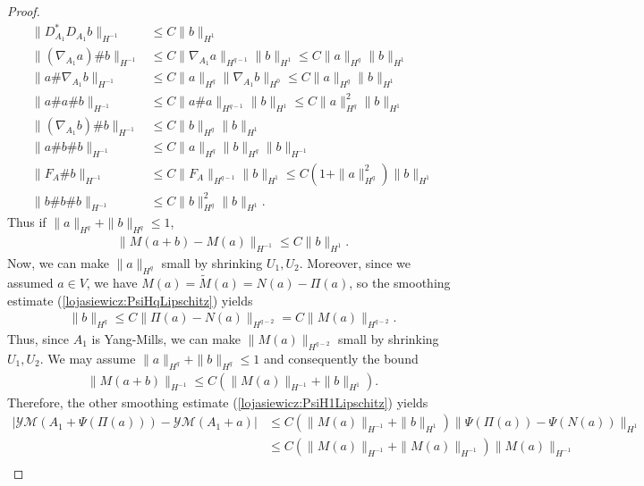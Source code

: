 \documentclass[12pt]{amsart}
\renewcommand{\1}{{\mathbf 1}}
\theoremstyle{others}
\numberwithin{equation}{section}
\begin{document}
\begin{proof}
    \begin{align*}
        \|D_{A_1}^\ast D_{A_1} b\|_{H^{-1}} &\leq C\|b\|_{H^1} \\
        \|(\nabla_{A_1} a) \# b \|_{H^{-1}} &\leq C\|\nabla_{A_1} a\|_{H^{q-1}}\|b\|_{H^1} \leq C\|a\|_{H^q}\|b\|_{H^1} \\
        \|a \# \nabla_{A_1} b\|_{H^{-1}} &\leq C\|a\|_{H^q} \|\nabla_{A_1} b\|_{H^0} \leq C\|a\|_{H^q}\|b\|_{H^1} \\
        \|a \# a \# b\|_{H^{-1}} &\leq C\|a \# a\|_{H^{q-1}} \|b\|_{H^1} \leq C\|a\|_{H^q}^2\|b\|_{H^1} \\
        \|(\nabla_{A_1} b) \# b\|_{H^{-1}} &\leq C\|b\|_{H^q} \|b\|_{H^1} \\
        \|a \# b \# b\|_{H^{-1}} &\leq C\|a\|_{H^q}\|b\|_{H^q}\|b\|_{H^{-1}} \\
        \|F_A \# b\|_{H^{-1}} &\leq C\|F_A\|_{H^{q-1}} \|b\|_{H^1} \leq C(1 +  \|a\|_{H^q}^2)\|b\|_{H^1} \\
        \|b \# b \# b\|_{H^{-1}} &\leq C\|b\|_{H^q}^2\|b\|_{H^1}.
    \end{align*}Thus if \(\|a\|_{H^q} + \|b\|_{H^q} \leq 1\),
    \begin{align}\label{lojasiewicz:D*FH-1continuous}
        \|M(a + b) - M(a)\|_{H^{-1}} \leq C\|b\|_{H^1}.
    \end{align} Now, we can make \(\|a\|_{H^q}\) small by shrinking \(U_1, U_2\). Moreover, since we assumed \(a \in V\), we have \(M(a) = \tilde{M}(a) = N(a) - \Pi(a)\), so the smoothing estimate (\ref{lojasiewicz:PsiHqLipschitz}) yields
    \begin{align*}
        \|b\|_{H^q} \leq C\|\Pi(a) - N(a)\|_{H^{q-2}} = C\|M(a)\|_{H^{q-2}}.
    \end{align*} Thus, since \(A_1\) is Yang-Mills, we can make \(\|M(a)\|_{H^{q-2}}\) small by shrinking \(U_1, U_2\). We may assume \(\|a\|_{H^q} + \|b\|_{H^q} \leq 1\) and consequently the bound
    \begin{align*}
        \|M(a + b)\|_{H^{-1}} \leq C(\|M(a)\|_{H^{-1}} + \|b\|_{H^1}).
    \end{align*} Therefore, the other smoothing estimate (\ref{lojasiewicz:PsiH1Lipschitz}) yields
    \begin{align*}
        |\mathcal{YM}(A_1 + \Psi(\Pi(a))) - \mathcal{YM}(A_1+a)| &\leq
        C(\|M(a)\|_{H^{-1}} + \|b\|_{H^1})\|\Psi(\Pi(a)) - \Psi(N(a))\|_{H^1} \\
        &\leq C(\|M(a)\|_{H^{-1}} + \|M(a)\|_{H^{-1}})\|M(a)\|_{H^{-1}}\\

\end{align*}
\end{proof}
\end{document}
